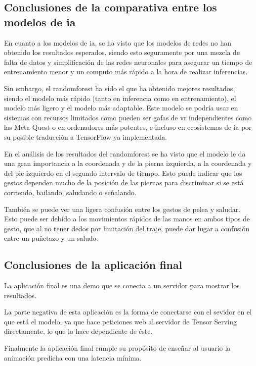 \subsection{Conclusiones de la comparativa entre los modelos de \gls{ia}}

En cuanto a los modelos de \gls{ia}, se ha visto que los modelos de redes no han obtenido los resultados esperados, siendo esto seguramente por una mezcla de falta de datos y simplificación de las redes neuronales para asegurar un tiempo de entrenamiento menor y un computo más rápido a la hora de realizar inferencias.

Sin embargo, el \gls{randomforest} ha sido el que ha obtenido mejores resultados, siendo el modelo más rápido (tanto en inferencia como en entrenamiento), el modelo más ligero y el modelo más adaptable. Este modelo se podría usar en sistemas con recursos limitados como pueden ser gafas de \gls{vr} independientes como las Meta Quest o en ordenadores más potentes, e incluso en ecosistemas de \gls{ia} por su posible traducción a TensorFlow ya implementada.

En el análisis de los resultados del \gls{randomforest} se ha visto que el modelo le da una gran importancia a la coordenada y de la pierna izquierda, a la coordenada y del pie izquierdo en el segundo intervalo de tiempo. Esto puede indicar que los gestos dependen mucho de la posición de las piernas para discriminar si se está corriendo, bailando, saludando o señalando.

También se puede ver una ligera confusión entre los gestos de pelea y saludar. Esto puede ser debido a los movimientos rápidos de las manos en ambos tipos de gesto, que al no tener dedos por limitación del traje, puede dar lugar a confusión entre un puñetazo y un saludo.

\subsection{Conclusiones de la aplicación final}
La aplicación final es una demo que se conecta a un servidor para mostrar los resultados.

La parte negativa de esta aplicación es la forma de conectarse con el sevidor en el que está el modelo, ya que hace peticiones web al servidor de Tensor Serving directamente, lo que lo hace dependiente de éste.

Finalmente la aplicación final cumple su propósito de enseñar al usuario la animación predicha con una latencia mínima.


